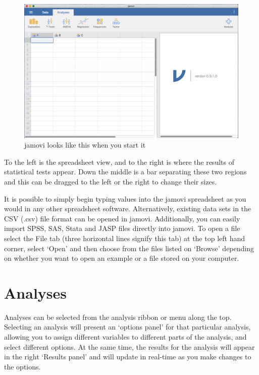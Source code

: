 \documentclass[
]{book}
\begin{document}
\begin{figure}
\includegraphics[width=17.81in]{img/introj/startingjamovi} \caption{ jamovi looks like this when you start it}\label{fig:startingjamovi}
\end{figure}

To the left is the spreadsheet view, and to the right is where the results of statistical tests appear. Down the middle is a bar separating these two regions and this can be dragged to the left or the right to change their sizes.

It is possible to simply begin typing values into the jamovi spreadsheet as you would in any other spreadsheet software. Alternatively, existing data sets in the CSV (.csv) file format can be opened in jamovi. Additionally, you can easily import SPSS, SAS, Stata and JASP files directly into jamovi. To open a file select the File tab (three horizontal lines signify this tab) at the top left hand corner, select `Open' and then choose from the files listed on `Browse' depending on whether you want to open an example or a file stored on your computer.

\hypertarget{analyses}{%
\section{Analyses}\label{analyses}}

Analyses can be selected from the analysis ribbon or menu along the top. Selecting an analysis will present an `options panel' for that particular analysis, allowing you to assign different variables to different parts of the analysis, and select different options. At the same time, the results for the analysis will appear in the right `Results panel' and will update in real-time as you make changes to the options.
\end{document}
